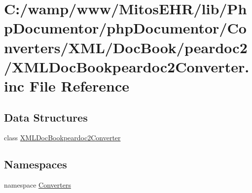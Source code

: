 \hypertarget{_x_m_l_doc_bookpeardoc2_converter_8inc}{\section{\-C\-:/wamp/www/\-Mitos\-E\-H\-R/lib/\-Php\-Documentor/php\-Documentor/\-Converters/\-X\-M\-L/\-Doc\-Book/peardoc2/\-X\-M\-L\-Doc\-Bookpeardoc2\-Converter.inc \-File \-Reference}
\label{_x_m_l_doc_bookpeardoc2_converter_8inc}
}
\subsection*{\-Data \-Structures}
\begin{DoxyCompactItemize}
\item 
class \hyperlink{class_x_m_l_doc_bookpeardoc2_converter}{\-X\-M\-L\-Doc\-Bookpeardoc2\-Converter}
\end{DoxyCompactItemize}
\subsection*{\-Namespaces}
\begin{DoxyCompactItemize}
\item 
namespace \hyperlink{namespace_converters}{\-Converters}
\end{DoxyCompactItemize}
